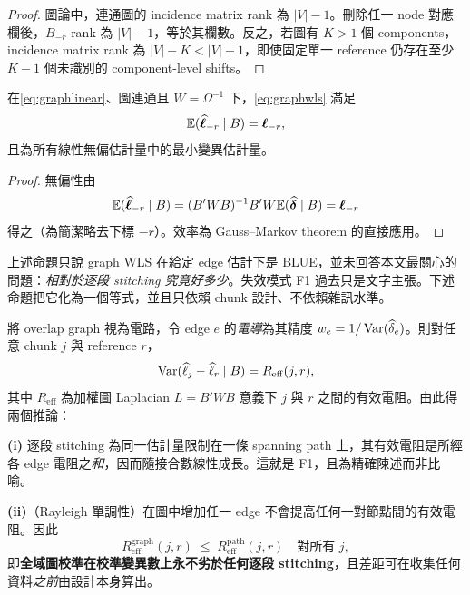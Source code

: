 \documentclass[12pt,a4paper,oneside]{article}
\begin{document}
\begin{proof}
圖論中，連通圖的 incidence matrix rank 為 $|V|-1$。刪除任一 node 對應欄後，$B_{-r}$ rank 為 $|V|-1$，等於其欄數。反之，若圖有 $K>1$ 個 components，incidence matrix rank 為 $|V|-K<|V|-1$，即使固定單一 reference 仍存在至少 $K-1$ 個未識別的 component-level shifts。
\end{proof}

\begin{proposition}
在\cref{eq:graphlinear}、圖連通且 $W=\Omega^{-1}$ 下，\cref{eq:graphwls} 滿足
\begin{equation}
\mathbb{E}(\widehat{\bm\ell}_{-r}\mid B)=\bm\ell_{-r},
\end{equation}
且為所有線性無偏估計量中的最小變異估計量。
\end{proposition}

\begin{proof}
無偏性由
\[
\mathbb{E}(\widehat{\bm\ell}_{-r}\mid B)
=(B'WB)^{-1}B'W\mathbb{E}(\widehat{\bm\delta}\mid B)
=\bm\ell_{-r}
\]
得之（為簡潔略去下標 $-r$）。效率為 Gauss--Markov theorem 的直接應用。
\end{proof}

上述命題只說 graph WLS 在給定 edge 估計下是 BLUE，並未回答本文最關心的問題：\emph{相對於逐段 stitching 究竟好多少}。失效模式 F1 過去只是文字主張。下述命題把它化為一個等式，並且只依賴 chunk 設計、不依賴雜訊水準。

\begin{proposition}[校準變異數即有效電阻]
\label{prop:reff}
將 overlap graph 視為電路，令 edge $e$ 的\emph{電導}為其精度 $w_e=1/\operatorname{Var}(\widehat\delta_e)$。則對任意 chunk $j$ 與 reference $r$，
\begin{equation}
\operatorname{Var}(\widehat\ell_j-\widehat\ell_r\mid B)=R_{\mathrm{eff}}(j,r),
\label{eq:reff}
\end{equation}
其中 $R_{\mathrm{eff}}$ 為加權圖 Laplacian $L=B'WB$ 意義下 $j$ 與 $r$ 之間的有效電阻。由此得兩個推論：

\textbf{(i)} 逐段 stitching 為同一估計量限制在一條 spanning path 上，其有效電阻是所經各 edge 電阻之\emph{和}，因而隨接合數線性成長。這就是 F1，且為精確陳述而非比喻。

\textbf{(ii)}（Rayleigh 單調性）在圖中增加任一 edge 不會提高任何一對節點間的有效電阻。因此
\begin{equation}
R_{\mathrm{eff}}^{\text{graph}}(j,r)\;\le\;R_{\mathrm{eff}}^{\text{path}}(j,r)
\quad\text{對所有 }j,
\label{eq:rayleigh}
\end{equation}
即\textbf{全域圖校準在校準變異數上永不劣於任何逐段 stitching}，且差距可在收集任何資料\emph{之前}由設計本身算出。
\end{proposition}
\end{document}
